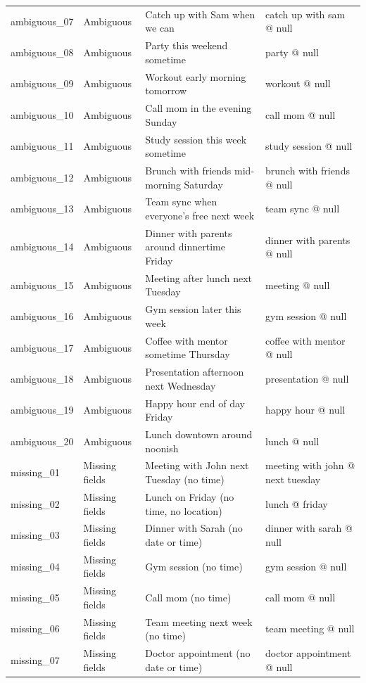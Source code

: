 \begin{longtable}{@{}p{2.2cm}p{2.1cm}p{5cm}p{5cm}@{}}
ambiguous\_07 & Ambiguous & Catch up with Sam when we can & catch up with sam @ null \\
ambiguous\_08 & Ambiguous & Party this weekend sometime & party @ null \\
ambiguous\_09 & Ambiguous & Workout early morning tomorrow & workout @ null \\
ambiguous\_10 & Ambiguous & Call mom in the evening Sunday & call mom @ null \\
ambiguous\_11 & Ambiguous & Study session this week sometime & study session @ null \\
ambiguous\_12 & Ambiguous & Brunch with friends mid-morning Saturday & brunch with friends @ null \\
ambiguous\_13 & Ambiguous & Team sync when everyone's free next week & team sync @ null \\
ambiguous\_14 & Ambiguous & Dinner with parents around dinnertime Friday & dinner with parents @ null \\
ambiguous\_15 & Ambiguous & Meeting after lunch next Tuesday & meeting @ null \\
ambiguous\_16 & Ambiguous & Gym session later this week & gym session @ null \\
ambiguous\_17 & Ambiguous & Coffee with mentor sometime Thursday & coffee with mentor @ null \\
ambiguous\_18 & Ambiguous & Presentation afternoon next Wednesday & presentation @ null \\
ambiguous\_19 & Ambiguous & Happy hour end of day Friday & happy hour @ null \\
ambiguous\_20 & Ambiguous & Lunch downtown around noonish & lunch @ null \\
missing\_01 & Missing fields & Meeting with John next Tuesday (no time) & meeting with john @ next tuesday \\
missing\_02 & Missing fields & Lunch on Friday (no time, no location) & lunch @ friday \\
missing\_03 & Missing fields & Dinner with Sarah (no date or time) & dinner with sarah @ null \\
missing\_04 & Missing fields & Gym session (no time) & gym session @ null \\
missing\_05 & Missing fields & Call mom (no time) & call mom @ null \\
missing\_06 & Missing fields & Team meeting next week (no time) & team meeting @ null \\
missing\_07 & Missing fields & Doctor appointment (no date or time) & doctor appointment @ null \\

\end{longtable}
